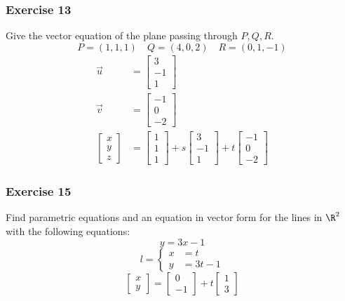 \documentclass[letterpaper, 12pt]{math}
\begin{document}
\subsubsection*{Exercise 13}
Give the vector equation of the plane passing through \( P, Q, R \).
\[ P = (1,1,1) \quad Q = (4,0,2) \quad R = (0,1,-1) \]
\begin{align*}
  \vec{u} &= \begin{bmatrix}3 \\ -1 \\ 1\end{bmatrix} \\
  \vec{v} &= \begin{bmatrix}-1 \\ 0 \\ -2\end{bmatrix} \\
  \begin{bmatrix}x \\ y \\ z\end{bmatrix} &=
    \begin{bmatrix}1 \\ 1 \\ 1\end{bmatrix}+
    s\begin{bmatrix}3 \\ -1 \\ 1\end{bmatrix}+
    t\begin{bmatrix}-1 \\ 0 \\ -2\end{bmatrix}
\end{align*}

\subsubsection*{Exercise 15}
Find parametric equations and an equation in vector form for the lines in
\( \R^2 \) with the following equations:
\[ y = 3x-1 \]
\[ l = \begin{cases}
  x &= t \\
  y &= 3t-1
\end{cases} \]
\[ \begin{bmatrix}x \\ y\end{bmatrix} = \begin{bmatrix}0 \\ -1\end{bmatrix}+
  t\begin{bmatrix}1 \\ 3\end{bmatrix} \]
\end{document}
